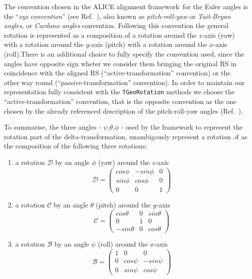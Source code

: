 \documentclass[12pt,a4paper,twoside]{article}
\newcommand{\FR}{ALICE alignment framework}
\begin{document}
{The convention chosen in the \FR\ for the Euler angles is the
``\emph{xyz convention}'' (see Ref.~\cite{mathworld}), also known as
\emph{pitch-roll-yaw} or \emph{Tait-Bryan angles}, or \emph{Cardano
angles} convention. Following this convention the general rotation is
represented as a composition of a rotation around the $z$-axis (yaw)
with a rotation around the $y$-axis (pitch) with a rotation around the
$x$-axis (roll).There is an additional choice to fully specify the
convention used, since the angles have opposite sign wheter we
consider them bringing the original RS in coincidence with the aligned
RS (``active-transformation'' convention) or the other way round
(``passive-transformation'' convention). In order to maintain our
representation fully consistent with the \lstinline!TGeoRotation!
methods we choose the ``active-transformation'' convention, that is
the opposite convention as the one chosen by the already referenced
description of the pitch-roll-yaw angles (Ref.~\cite{mathworld}).

To summarise, the three angles - $\psi$,$\theta$,$\phi$
- used by the framework to represent the rotation part of the
delta-transformation, unambigously represent a rotation $\mathcal{A}$
as the composition of the following three rotations:
\begin{enumerate}
\item a rotation $\mathcal{D}$ by an angle $\phi$ (yaw) around the $z$-axis
$$  \mathcal{D} = \left( \begin{array}{ccc}
            cos\phi & -sin\phi & 0 \\
            sin\phi & cos\phi & 0 \\
            0 & 0 & 1
        \end{array} \right)$$
\item a rotation $\mathcal{C}$ by an angle $\theta$ (pitch) around the $y$-axis
$$  \mathcal{C} = \left( \begin{array}{ccc}
	    cos\theta & 0 & sin\theta \\
            0 & 1 & 0 \\
            -sin\theta & 0 & cos\theta
        \end{array} \right)$$
\item a rotation $\mathcal{B}$ by an angle $\psi$ (roll) around the $x$-axis
$$  \mathcal{B} = \left( \begin{array}{ccc}
            1 & 0 & 0 \\
            0 & cos\psi & -sin\psi \\
            0 & sin\psi & cos\psi
        \end{array} \right) $$
\end{enumerate}

}
\end{document}

